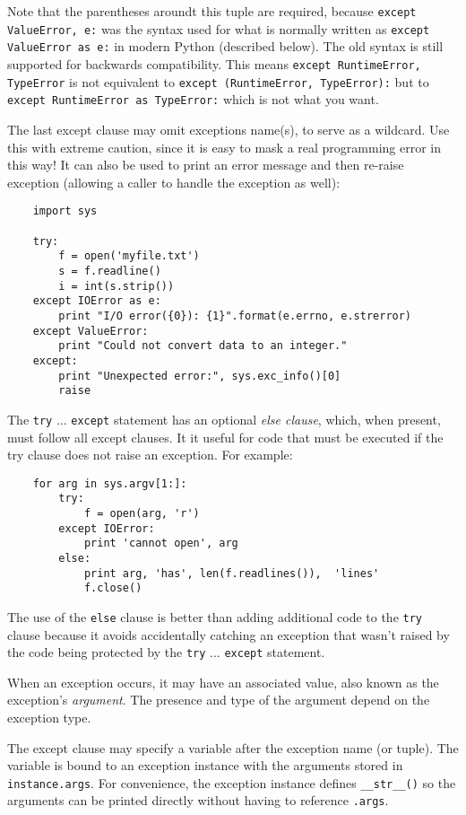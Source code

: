 \documentclass[UTF8]{article}
\begin{document}
Note that the parentheses aroundt this tuple are required, because
\texttt{except ValueError, e:} was the syntax used for what is normally written as
\texttt{except ValueError as e:} in modern Python (described below). The old syntax is
still supported for backwards compatibility. This means
\texttt{except RuntimeError, TypeError} is not equivalent to
\texttt{except (RuntimeError, TypeError):} but to
\texttt{except RuntimeError as TypeError:} which is not what you want.

The last except clause may omit exceptions name(s), to serve as a wildcard. Use this with extreme
caution, since it is easy to mask a real programming error in this way! It can also be used to
print an error message and then re-raise exception (allowing a caller to handle the exception as
well):
\begin{verbatim}
    import sys

    try:
        f = open('myfile.txt')
        s = f.readline()
        i = int(s.strip())
    except IOError as e:
        print "I/O error({0}): {1}".format(e.errno, e.strerror)
    except ValueError:
        print "Could not convert data to an integer."
    except:
        print "Unexpected error:", sys.exc_info()[0]
        raise
\end{verbatim}

The \texttt{try} ... \texttt{except} statement has an optional \emph{else clause}, which, when
present, must follow all except clauses. It it useful for code that must be executed if the try
clause does not raise an exception. For example:
\begin{verbatim}
    for arg in sys.argv[1:]:
        try:
            f = open(arg, 'r')
        except IOError:
            print 'cannot open', arg
        else:
            print arg, 'has', len(f.readlines()),  'lines'
            f.close()
\end{verbatim}

The use of the \texttt{else} clause is better than adding additional code to the \texttt{try}
clause because it avoids accidentally catching an exception that wasn't raised by the code being
protected by the \texttt{try} ... \texttt{except} statement.

When an exception occurs, it may have an associated value, also known as the exception's
\emph{argument}. The presence and type of the argument depend on the exception type.

The except clause may specify a variable after the exception name (or tuple). The variable is bound
to an exception instance with the arguments stored in \texttt{instance.args}. For convenience, the
exception instance defines \texttt{\_\_str\_\_()} so the arguments can be printed directly without
having to reference \texttt{.args}.
\end{document}
